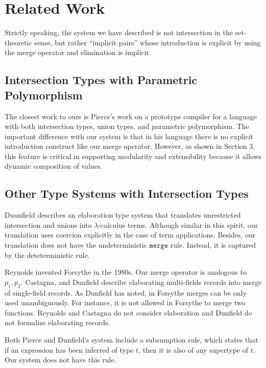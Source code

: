\section{Related Work}

Strictly speaking, the system we have described is not intersection in the
set-theoretic sense, but rather ``implicit pairs'' whose introduction is
explicit by using the merge operator and elimination is implicit.

\subsection{Intersection Types with Parametric Polymorphism}

The closest work to ours is Pierce's work on a prototype compiler for a language
with both intersection types, union types, and parametric polymorphism. The
important difference with our system is that in his language there is no
explicit introduction construct like our merge operator. However, as shown in
Section 3, this feature is critical in supporting modularity and extensibility
because it allows dynamic composition of values.

\subsection{Other Type Systems with Intersection Types}

Duunfield describes an elaboration type system that translates unrestricted
intersection and unions into $\lambda$-calculus terms. Although similar in this
spirit, our translation uses coercion explicitly in the case of term
applications. Besides, our translation does not have the undeterministic
$ \texttt{merge} $ rule. Instead, it is captured by the deteterministic
 rule.

Reynolds invented Forsythe in the 1980s. Our merge operator is analogous to
$ p_1, p_2 $. Castagna, and Dunfield describe elaborating multi-fields records
into merge of single-field records. As Dunfield has noted, in Forsythe merges
can be only used unambiguously. For instance, it is not allowed in Forsythe to
merge two functions. Reynolds and Castagna do not consider elaboration and
Dunfield do not formalize elaborating records.

Both Pierce and Dunfield's system include a subsumption rule, which states that
if an expression has been inferred of type $ t $, then it is also of any
supertype of $ t $. Our system does not have this rule.

